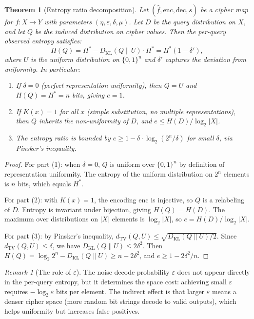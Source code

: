 \documentclass[11pt]{article}
\theoremstyle{definition}
\theoremstyle{plain}
\newtheorem{theorem}{Theorem}[section]
\theoremstyle{remark}
\newtheorem{remark}{Remark}[section]
\newcommand{\fhat}{\hat{f}}
\newcommand{\enc}{\mathrm{enc}}
\newcommand{\dec}{\mathrm{dec}}
\newcommand{\TV}{d_{\mathrm{TV}}}
\newcommand{\B}{\{0,1\}}
\begin{document}
\begin{theorem}[Entropy ratio decomposition]
\label{thm:entropy-decomposition}
Let $(\fhat, \enc, \dec, s)$ be a cipher map for $f : X \to Y$ with
parameters $(\eta, \varepsilon, \delta, \mu)$.  Let $D$ be the query
distribution on $X$, and let $Q$ be the induced distribution on cipher
values.  Then the per-query observed entropy satisfies:
\begin{equation}
\label{eq:entropy-decomp}
H(Q) = H^* - D_{\mathrm{KL}}(Q \| U) \cdot H^*
      = H^* (1 - \delta'),
\end{equation}
where $U$ is the uniform distribution on $\B^n$ and $\delta'$ captures
the deviation from uniformity.  In particular:
\begin{enumerate}
\item If $\delta = 0$ (perfect representation uniformity), then $Q = U$
  and $H(Q) = H^* = n$ bits, giving $e = 1$.
\item If $K(x) = 1$ for all $x$ (simple substitution, no multiple
  representations), then $Q$ inherits the non-uniformity of $D$, and
  $e \leq H(D) / \log_2 |X|$.
\item The entropy ratio is bounded by $e \geq 1 - \delta \cdot
  \log_2(2^n / \delta)$ for small $\delta$, via Pinsker's inequality.
\end{enumerate}
\end{theorem}

\begin{proof}
For part (1): when $\delta = 0$, $Q$ is uniform over $\B^n$ by
definition of representation uniformity.  The entropy of the uniform
distribution on $2^n$ elements is $n$ bits, which equals $H^*$.

For part (2): with $K(x) = 1$, the encoding $\enc$ is injective, so $Q$
is a relabeling of $D$.  Entropy is invariant under bijection, giving
$H(Q) = H(D)$.  The maximum over distributions on $|X|$ elements is
$\log_2 |X|$, so $e = H(D) / \log_2 |X|$.

For part (3): by Pinsker's inequality,
$\TV(Q, U) \leq \sqrt{D_{\mathrm{KL}}(Q \| U) / 2}$.  Since
$\TV(Q, U) \leq \delta$, we have
$D_{\mathrm{KL}}(Q \| U) \leq 2\delta^2$.  Then
$H(Q) = \log_2 2^n - D_{\mathrm{KL}}(Q \| U) \geq n - 2\delta^2$,
and $e \geq 1 - 2\delta^2/n$.
\end{proof}

\begin{remark}[The role of $\varepsilon$]
The noise decode probability $\varepsilon$ does not appear directly in
the per-query entropy, but it determines the space cost: achieving small
$\varepsilon$ requires $-\log_2 \varepsilon$ bits per element.  The
indirect effect is that larger $\varepsilon$ means a denser cipher space
(more random bit strings decode to valid outputs), which helps uniformity
but increases false positives.
\end{remark}
\end{document}
